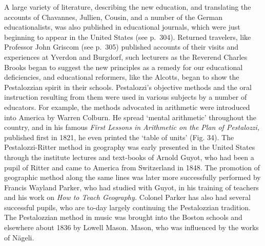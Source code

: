 \documentclass[]{book}
\begin{document}
A large variety of literature, describing the new education, and translating the accounts of Chavannes, Jullien, Cousin, and a number of the German educationalists, was also published in educational journals, which were just beginning to appear in the United States (see p.~304). Returned travelers, like Professor John Griscom (see p.~305) published accounts of their visits and experiences at Yverdon and Burgdorf, such lecturers as the Reverend Charles Brooks began to suggest the new principles as a remedy for our educational deficiencies, and educational reformers, like the Alcotts, began to show the Pestalozzian spirit in their schools. Pestalozzi's objective methods and the oral instruction resulting from them were used in various subjects by a number of educators. For example, the methods advocated in arithmetic were introduced into America by Warren Colburn. He spread `mental arithmetic' throughout the country, and in his famous \emph{First Lessons in Arithmetic on the Plan of Pestalozzi,} published first in 1821, he even printed the `table of units' (Fig. 34). The Pestalozzi-Ritter method in geography was early presented in the United States through the institute lectures and text-books of Arnold Guyot, who had been a pupil of Ritter and came to America from Switzerland in 1848. The promotion of geographic method along the same lines was later more successfully performed by Francis Wayland Parker, who had studied with Guyot, in his training of teachers and his work on \emph{How to Teach Geography.} Colonel Parker has also had several successful pupils, who are to-day largely continuing the Pestalozzian tradition. The Pestalozzian method in music was brought into the Boston schools and elsewhere about 1836 by Lowell Mason. Mason, who was influenced by the works of Nägeli.
\end{document}

